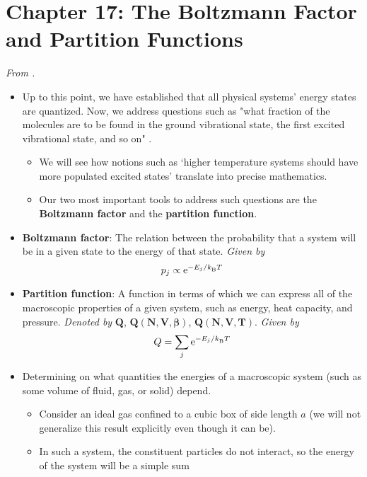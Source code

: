 \documentclass[../notes.tex]{subfiles}
\begin{document}
\section{Chapter 17: The Boltzmann Factor and Partition Functions}
\emph{From \textcite{bib:McQuarrieSimon}.}
\begin{itemize}
    \item {}Up to this point, we have established that all physical systems' energy states are quantized. Now, we address questions such as "what fraction of the molecules are to be found in the ground vibrational state, the first excited vibrational state, and so on" \parencite[693]{bib:McQuarrieSimon}.
    \begin{itemize}
        \item We will see how notions such as `higher temperature systems should have more populated excited states' translate into precise mathematics.
        \item Our two most important tools to address such questions are the \textbf{Boltzmann factor} and the \textbf{partition function}.
    \end{itemize}
    \item \textbf{Boltzmann factor}: The relation between the probability that a system will be in a given state to the energy of that state. \emph{Given by}
    \begin{equation*}
        p_j \propto \e[-E_j/\kB T]
    \end{equation*}
    \item \textbf{Partition function}: A function in terms of which we can express all of the macroscopic properties of a given system, such as energy, heat capacity, and pressure. \emph{Denoted by} $\bm{Q}$, $\bm{Q(N,V,\beta)}$, $\bm{Q(N,V,T)}$. \emph{Given by}
    \begin{equation*}
        Q = \sum_j\e[-E_j/\kB T]
    \end{equation*}
    \item Determining on what quantities the energies of a macroscopic system (such as some volume of fluid, gas, or solid) depend.
    \begin{itemize}
        \item Consider an ideal gas confined to a cubic box of side length $a$ (we will not generalize this result explicitly even though it can be).
        \item In such a system, the constituent particles do not interact, so the energy of the system will be a simple sum
        \begin{equation*}

\end{equation*}
\end{itemize}
\end{itemize}
\end{document}
